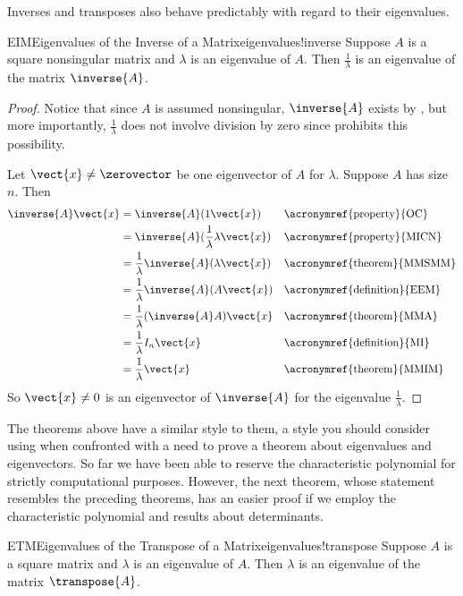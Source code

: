 %
Inverses and transposes also behave predictably with regard to their eigenvalues.
%
\begin{theorem}{EIM}{Eigenvalues of the Inverse of a Matrix}{eigenvalues!inverse}
Suppose $A$ is a square nonsingular matrix and $\lambda$ is an eigenvalue of $A$.  Then $\frac{1}{\lambda}$ is an eigenvalue of the matrix $\inverse{A}$.
\end{theorem}
%
\begin{proof}
%
Notice that since $A$ is assumed nonsingular, $\inverse{A}$ exists by , but more importantly, $\frac{1}{\lambda}$  does not involve division by zero since  prohibits this possibility.\par
%
Let $\vect{x}\neq\zerovector$ be one eigenvector of $A$ for $\lambda$. Suppose $A$ has size $n$.  Then
%
\begin{align*}
\inverse{A}\vect{x}&=\inverse{A}(1\vect{x})&&\text{\acronymref{property}{OC}}\\
&=\inverse{A}(\frac{1}{\lambda}\lambda\vect{x})&&\text{\acronymref{property}{MICN}}\\
&=\frac{1}{\lambda}\inverse{A}(\lambda\vect{x})&&\text{\acronymref{theorem}{MMSMM}}\\
&=\frac{1}{\lambda}\inverse{A}(A\vect{x})&&\text{\acronymref{definition}{EEM}}\\
&=\frac{1}{\lambda}(\inverse{A}A)\vect{x}&&\text{\acronymref{theorem}{MMA}}\\
&=\frac{1}{\lambda}I_n\vect{x}&&\text{\acronymref{definition}{MI}}\\
&=\frac{1}{\lambda}\vect{x}&&\text{\acronymref{theorem}{MMIM}}
%
\end{align*}
%
So $\vect{x}\neq 0$ is an eigenvector of $\inverse{A}$ for the eigenvalue $\frac{1}{\lambda}$.
%
\end{proof}
%
The theorems above have a similar style to them, a style you should consider using when confronted with a need to prove a theorem about eigenvalues and eigenvectors.  So far we have been able to reserve the characteristic polynomial for strictly computational purposes.  However, the next theorem, whose statement resembles the preceding theorems, has an easier proof if we employ the characteristic polynomial and results about determinants.
%
\begin{theorem}{ETM}{Eigenvalues of the Transpose of a Matrix}{eigenvalues!transpose}
Suppose $A$ is a square matrix and $\lambda$ is an eigenvalue of $A$.  Then $\lambda$ is an eigenvalue of the matrix $\transpose{A}$.
\end{theorem}
